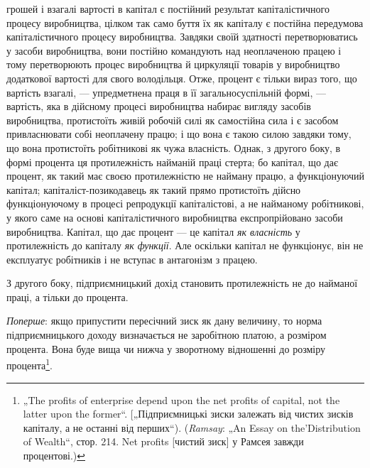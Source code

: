 \parcont{}  %
грошей і взагалі вартості в капітал є постійний результат капіталістичного
процесу виробництва, цілком так само буття їх
як капіталу є постійна передумова капіталістичного процесу
виробництва. Завдяки своїй здатності перетворюватись у засоби
виробництва, вони постійно командують над неоплаченою
працею і тому перетворюють процес виробництва й циркуляції
товарів у виробництво додаткової вартості для свого володільця.
Отже, процент є тільки вираз того, що вартість взагалі, —
упредметнена праця в її загальносуспільній формі, — вартість,
яка в дійсному процесі виробництва набирає вигляду засобів виробництва,
протистоїть живій робочій силі як самостійна сила
і є засобом привласнювати собі неоплачену працю; і що вона є такою
силою завдяки тому, що вона протистоїть робітникові як
чужа власність. Однак, з другого боку, в формі процента ця
протилежність найманій праці стерта; бо капітал, що дає процент,
як такий має своєю протилежністю не найману працю,
а функціонуючий капітал; капіталіст-позикодавець як такий прямо
протистоїть дійсно функціонуючому в процесі репродукції капіталістові,
а не найманому робітникові, у якого саме на основі
капіталістичного виробництва експропрійовано засоби виробництва.
Капітал, що дає процент — це капітал \emph{як власність} у
протилежність до капіталу \emph{як функції}. Але оскільки капітал
не функціонує, він не експлуатує робітників і не вступає в антагонізм
з працею.

З другого боку, підприємницький дохід становить протилежність
не до найманої праці, а тільки до процента.

\emph{Поперше}: якщо припустити пересічний зиск як дану величину,
то норма підприємницького доходу визначається не заробітною
платою, а розміром процента. Вона буде вища чи нижча
у зворотному відношенні до розміру процента\footnote{
„The profits of enterprise depend upon the net profits of capital, not the
latter upon the former“. [„Підприємницькі зиски залежать від чистих зисків капіталу,
а не останні від перших“). (\emph{Ramsay}: „An Essay on the'Distribution of Wealth“,
стор. 214. Net profits [чистий зиск] у Рамсея завжди \deq{} процентові.)
}.

